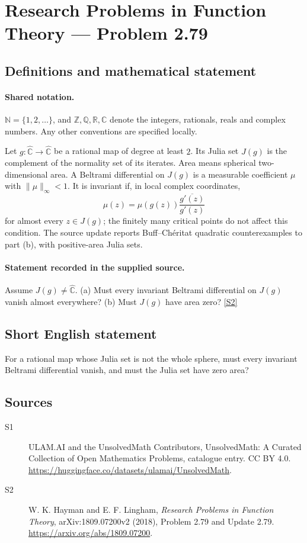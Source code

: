 \documentclass[11pt]{article}
\newcommand{\sref}[2]{\hyperlink{source:#1:#2}{[S#2]}}
\begin{document}
\section{Research Problems in Function Theory — Problem 2.79}\label{statement}

\subsection{Definitions and mathematical statement}

\paragraph{Shared notation.}$\mathbb N=\{1,2,\ldots\}$, and $\mathbb Z,\mathbb Q,\mathbb R,\mathbb C$ denote the integers, rationals, reals and complex numbers. Any other conventions are specified locally.


Let $g:\widehat{\mathbb C}\to\widehat{\mathbb C}$ be a rational map of degree at least $2$. Its Julia set $J(g)$ is the complement of the normality set of its iterates. Area means spherical two-dimensional area. A Beltrami differential on $J(g)$ is a measurable coefficient $\mu$ with $\|\mu\|_\infty<1$. It is invariant if, in local complex coordinates,
\[\mu(z)=\mu(g(z))\frac{\overline{g'(z)}}{g'(z)}\]
for almost every $z\in J(g)$; the finitely many critical points do not affect this condition.
The source update reports Buff--Ch\'eritat quadratic counterexamples to part (b), with positive-area Julia sets.
\paragraph{Statement recorded in the supplied source.}
Assume $J(g)\ne\widehat{\mathbb C}$. (a) Must every invariant Beltrami differential on $J(g)$ vanish almost everywhere? (b) Must $J(g)$ have area zero? \sref{statement}{2}
\subsection{Short English statement}
For a rational map whose Julia set is not the whole sphere, must every invariant Beltrami differential vanish, and must the Julia set have zero area?
\subsection{Sources}
\begin{description}
\item[\hypertarget{source:statement:1}{S1}] ULAM.AI and the UnsolvedMath Contributors, UnsolvedMath: A Curated Collection of Open Mathematics Problems, catalogue entry. CC BY 4.0. \url{https://huggingface.co/datasets/ulamai/UnsolvedMath}.
\item[\hypertarget{source:statement:2}{S2}] W. K. Hayman and E. F. Lingham, \emph{Research Problems in Function Theory}, arXiv:1809.07200v2 (2018), Problem 2.79 and Update 2.79. \url{https://arxiv.org/abs/1809.07200}.
\end{description}
\label{end:statement}
\end{document}
